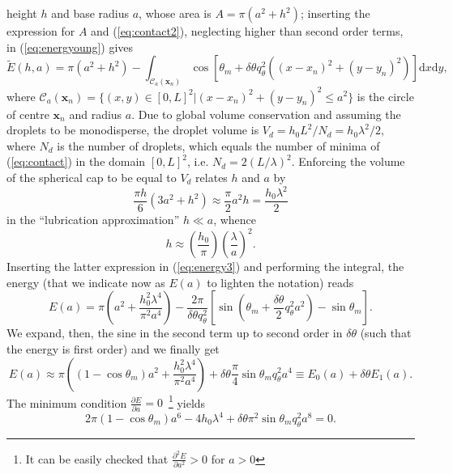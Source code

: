 height $h$ and base radius $a$, whose area is $A = \pi(a^2 + h^2)$; inserting the expression for
$A$ and (\ref{eq:contact2}), neglecting higher than second order terms, in (\ref{eq:energyoung}) gives
\begin{equation}\label{eq:energy3}
  \tilde{E}(h,a) = \pi(a^2 + h^2) -
  \int_{\mathcal{C}_a(\mathbf{x}_n)} \cos\left[\theta_m + \delta \theta q_{\theta}^2 ((x-x_n)^2 + (y - y_n)^2)\right]
    \text{d}x\text{d}y,
\end{equation}  
where
$\mathcal{C}_a(\mathbf{x}_n)=\{(x,y) \in [0, L]^2|(x-x_n)^2 + (y-y_n)^2 \leq a^2\}$
is the circle of centre $\mathbf{x}_n$ and radius $a$. 
Due to global volume conservation and assuming the droplets to be monodisperse, the droplet
volume is $V_d = h_0L^2/N_d = h_0 \lambda^2/2$,
where $N_d$ is the number of droplets, which equals the number of
minima of (\ref{eq:contact}) in the domain $[0, L]^2$, i.e. $N_d = 2(L/\lambda)^2$.
Enforcing the volume of the spherical cap to be equal to $V_d$ relates $h$ and $a$ by
\begin{equation}
\frac{\pi h}{6}(3a^2 + h^2) \approx \frac{\pi}{2} a^2 h =  \frac{h_0 \lambda^2}{2}    
\end{equation}
in the ``lubrication approximation'' $h \ll a$, whence
\begin{equation}
  h \approx \left(\frac{h_0}{\pi}\right) \left(\frac{\lambda}{a}\right)^2.
\end{equation}  
Inserting the latter expression in (\ref{eq:energy3}) and performing the integral, the
energy (that we indicate now as $E(a)$ to lighten the notation) reads
\begin{equation}\label{eq:energy4}
  E(a) = \pi \left(a^2 + \frac{h_0^2 \lambda^4}{\pi^2 a^4} \right) - \frac{2\pi}{\delta \theta q_{\theta}^2}
  \left[\sin\left(\theta_m +\frac{\delta \theta}{2}q_{\theta}^2a^2\right) - \sin \theta_m \right].
\end{equation}  
We expand, then, the sine in the second term up to second order in $\delta \theta$ (such that the
energy is first order) and we finally get
\begin{equation}\label{eq:energyfin}
  E(a) \approx  \pi \left((1-\cos \theta_m) a^2 + \frac{h_0^2 \lambda^4}{\pi^2 a^4} \right)
  + \delta \theta \frac{\pi}{4}\sin \theta_m q_{\theta}^2 a^4 \equiv E_0(a) + \delta \theta E_1(a).
\end{equation}  
The minimum condition $\frac{\partial E}{\partial a} = 0$~\footnote{It can be easily checked that $\frac{\partial^2 E}{\partial a^2} > 0$ for $a>0$} yields
\begin{equation}\label{eq:minim}
2\pi (1-\cos \theta_m)a^6 - 4h_0 \lambda^4 + \delta \theta \pi^2 \sin \theta_m q_{\theta}^2 a^8 =0.
\end{equation}  
